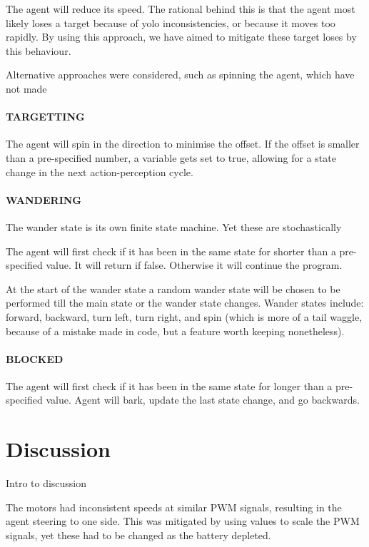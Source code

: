 \documentclass[conference]{IEEEtran}
\begin{document}
The agent will reduce its speed.
The rational behind this is that the agent most likely loses a target because of yolo inconsistencies, or because it moves too rapidly. 
By using this approach, we have aimed to mitigate these target loses by this behaviour.

Alternative approaches were considered, such as spinning the agent, which have not made

\paragraph{TARGETTING}

The agent will spin in the direction to minimise the offset. 
If the offset is smaller than a pre-specified number, a variable gets set to true, allowing for a state change in the next action-perception cycle.

\paragraph{WANDERING}
The wander state is its own finite state machine. Yet these are stochastically 

The agent will first check if it has been in the same state for shorter than a pre-specified value. 
It will return if false.
Otherwise it will continue the program.

At the start of the wander state a random wander state will be chosen to be performed till the main state or the wander state changes.
Wander states include: forward, backward, turn left, turn right, and spin (which is more of a tail waggle, because of a mistake made in code, but a feature worth keeping nonetheless).

\paragraph{BLOCKED}

The agent will first check if it has been in the same state for longer than a pre-specified value. 
Agent will bark, update the last state change, and go backwards.


\section{Discussion}

Intro to discussion

The motors had inconsistent speeds at similar PWM signals, resulting in the agent steering to one side.
This was mitigated by using values to scale the PWM signals, yet these had to be changed as the battery depleted.
\end{document}
